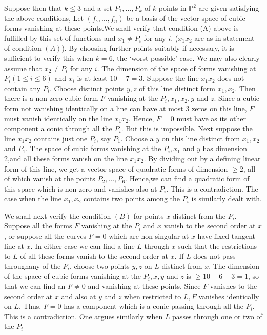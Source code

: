 Suppose then that $k \leq 3$ and a set $P_1 , \ldots , P_k$ of $k$
points in $\mathbb{P}^2$ are given satisfying the above conditions,
Let $(f_\circ , \ldots , f_n)$ be a basis of the vector space of cubic
forms vanishing at these points.We shall verify that condition (A)
above is fulfilled by this set of functions and $x_1 \neq P_i$ for any
$i$. ($x_1x_2$ are as in statement of condition $(A)$). By choosing
further points suitably if necessary, it is sufficient\pageoriginale
to verify this  when $k=6$, the `worst possible' case. We may also
clearly assume that $x_2 \neq P_i$  for any $i$. The dimension of the
space of forms vanishing at $P_i(1 \leq i \leq 6)$ and $x_i$ is at
least $10-7 =3$. Suppose the line $x_1 x_2$ does not contain any
$P_i$. Choose 
distinct points $y,z$ of this line distinct form $x_1, x_2$. Then
there is a non-zero cubic form $F$ vanishing at the $P_i,x_1,x_2,y$
and $z$. Since a cubic form not vanishing identically on a line can
have at most 3 zeros on this line, $F$ must vanish identically on
the line $x_1 x_2$. Hence, $F=0$ must have as its other component a
conic through all the $P_i$. But this is impossible. Next suppose the
line $x_1 x_2$ contains just one $P_i$, say $P_1$. Choose a $y$ on
this line distinct from $ x_1, x_2$ and $P_1$. The space of cubic
forms vanishing at the $P_i,x_1$ and $y$ has dimension 2,and all
these forms vanish on the line $x_1 x_2$. By dividing out by a
defining linear form of this line, we get a vector space of quadratic
forms of dimension $\geq 2$, all of which vanish at the points $P_2,
\ldots ,P_6$. Hence,we can find a quadratic form of this space which is
non-zero and vanishes also at $P_i$. This is a contradiction. The case
when the line $x_1,x_2$ contains two points among the $P_i$ is
similarly dealt with.  

We shall next verify the condition $(B)$ for points $x$ distinct from
the $P_i$. Suppose all the forms $F$ vanishing at the $P_i$ and $x$
vanish to the second order at $x$, or suppose all the curves $F=0$
which are non-singular at $x$ have fixed tangent line at $x$. In
either case we can find a line $L$ through $x$ such that the
restrictions to $L$ of all these forms vanish to the second order at
$x$. If $L$ does not pass through\pageoriginale any of the $P_i$,
choose two points 
$y,z$ on $L$ distinct from $x$. The dimension of the space of cubic
forms vanishing at the $P_i,x,y$ and $z$ is $\geq 10-6-3=1$, so that
we can find an $F \neq 0$ and vanishing at these points. Since $F$
vanishes to the second order at $x$ and also at $y$ and $z$ when
restricted to $L,F$ vanishes identically on $L$. Thus, $F=0$ has a
component which is a conic passing through all the $P_i$. This is a
contradiction. One argues similarly when $L$ passes through one or two
of the $P_i$  

